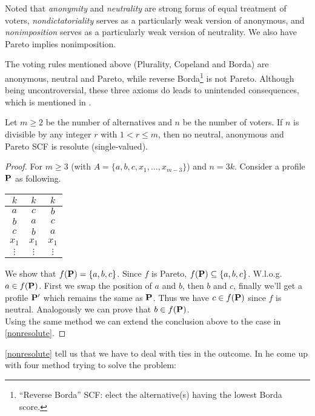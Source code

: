 Noted that \textit{anonymity} and \textit{neutrality} are strong forms of equal treatment of voters, \textit{nondictatoriality} serves as a particularly weak version of anonymous, and \textit{nonimposition} serves as a particularly weak version of neutrality. We also have Pareto implies nonimposition.

The voting rules mentioned above (Plurality, Copeland and Borda) are anonymous, neutral and Pareto, while reverse Borda\footnote{“Reverse Borda” SCF: elect the alternative(s) having the lowest Borda score.} is not Pareto. Although being uncontroversial, these three axioms do leads to unintended consequences, which is mentioned in \cite{moulin2014strategy}. 

\begin{proposition}
    \label{nonresolute}
    Let $m \geq 2$ be the number of alternatives and $n$ be the number of voters. If $n$ is divisible by any integer $r$ with $1 < r \leq m$, then no neutral, anonymous and Pareto SCF is resolute (single-valued).
\end{proposition}

\begin{proof}
    For $m \geq 3$ (with $A = \{a,b,c,x_1,\dots,x_{m-3}\}$) and $n = 3k$. Consider a profile $\mathbf{P}$ as following.
    \begin{center}
        \begin{tabular}{ccc}
            $k$ & $k$ & $k$\\
            \hline
            $a$ & $c$ & $b$\\
            $b$ & $a$ & $c$\\
            $c$ & $b$ & $a$\\
            $x_1$ & $x_1$ & $x_1$\\
            $\vdots$ & $\vdots$ & $\vdots$
        \end{tabular}
    \end{center}
    We show that $f(\mathbf{P}) = \{a,b,c\}$.
    Since $f$ is Pareto, $f(\mathbf{P}) \subseteq \{a,b,c\}$. W.l.o.g. $a \in f(\mathbf{P})$. First we swap the position of $a$ and $b$, then $b$ and $c$, finally we'll get a profile $\mathbf{P}'$ which remains the same as $\mathbf{P}$. Thus we have $c \in f(\mathbf{P})$ since $f$ is neutral. Analogously we can prove that $b \in f(\mathbf{P})$. \\
    Using the same method we can extend the conclusion above to the case in \cref{nonresolute}.
\end{proof}

\cref{nonresolute} tell us that we have to deal with ties in the outcome. In \cite{brandt_handbook_2016} he come up with four method trying to solve the problem:

